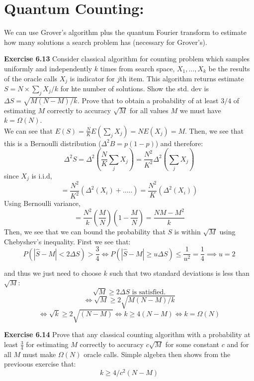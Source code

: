 \documentclass{article}
\begin{document}
\section{Quantum Counting:}
We can use Grover's algorithm plus the quantum Fourier transform to estimate how many solutions a search problem has (necessary for Grover's).
\begin{tcolorbox}\textbf{Exercise 6.13} Consider classical algorithm for counting problem which samples uniformly and independently $k$ times from search space, $X_1, \dots, X_k$ be the results of the oracle calls $X_j$ is indicator for $j$th item.  This algorithm returns estimate $S = N \times \sum_j X_j/k$ for hte number of solutions. Show the std. dev is $\Delta S = \sqrt{M(N-M)/k}$. Prove that to obtain a probability of at least $3/4$ of estimating $M$ correctly to accuracy $\sqrt{M}$ for all values $M$ we must have $k = \Omega(N)$.\\
	We can see that $E(S) = \frac{N}{K} E(\sum_j X_j) = N E(X_j) = M$. Then, we see that this is a Bernoulli distribution ($\Delta^2 B = p(1-p)$) and therefore:
	$$\Delta^2 S = \Delta^2 (\frac{N}{K} \sum_j {X_j}) = \frac{N^2}{K^2} \Delta^2 (\sum_j {X_j})$$
	since $X_j$ is i.i.d, 
	$$ = \frac{N^2}{K^2} (\Delta^2(X_i) + .....) = \frac{N^2}{K} (\Delta^2 (X_i))$$
	Using Bernoulli variance, 
	$$= \frac{N^2}{k} (\frac{M}{N})(1-\frac{M}{N}) = \frac{NM-M^2}{k}$$
Then, we see that we can bound the probability that $S$ is within $\sqrt{M}$ using Chebyshev's inequality. First we see that:
$$P(|\hat{S} - M| < 2 \Delta S) > \frac{3}{4} \iff P(|\hat{S} - M| \geq u \Delta S) \leq \frac{1}{u^2} = \frac{1}{4} \implies u = 2$$

and thus we just need to choose $k$ such that two standard deviations is less than $\sqrt{M}$:
$$ \sqrt{M} \geq 2 \Delta S \text{ is satisfied.}$$
$$ \iff \sqrt{M} \geq 2 \sqrt{M(N-M)/k}$$
$$\iff \sqrt{k} \geq 2\sqrt{(N-M)} \iff k \geq 4(N-M) \iff k = \Omega(N)$$
\end{tcolorbox}
\begin{tcolorbox}\textbf{Exercise 6.14} Prove that any classical counting algorithm with a probability at least $\frac{3}{4}$ for estimating $M$ correctly to accuracy $c\sqrt{M}$ for some constant $c$ and for all $M$ must make $\Omega(N)$ oracle calls.
Simple algebra then shows from the previoous exercise that:
$$k \geq 4/c^2 (N-M)$$
\end{tcolorbox}
\end{document}
